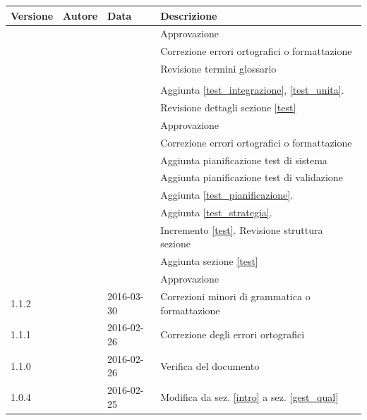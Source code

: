 \documentclass[12pt,a4paper]{article}
\begin{document}
\begin{center}
	\begin{longtable}[H]{p{} p{} p{} p{}}
		\toprule
		\textbf{Versione}	&	\textbf{Autore}	&	\textbf{Data}	&	\textbf{Descrizione}\\*
		\midrule
		\midrule
		\TODO{} &\TODO{} & \TODO{} &  Approvazione\\*
		\midrule
		\TODO{} &\TODO{} & \TODO{} & Correzione errori ortografici o formattazione \\*
		\midrule
		\TODO{} &\TODO{} & \TODO{} & Revisione termini glossario \\*
		\midrule
		\TODO{} &\TODO{} & \TODO{} &  \\*
		\midrule
		\TODO{} &\TODO{} & \TODO{} &  Aggiunta \ref{test_integrazione}, \ref{test_unita}.\\*
		\midrule
		\TODO{} &\TODO{} & \TODO{} &  Revisione dettagli sezione \ref{test}\\*
		\midrule
		\TODO{} &\TODO{} & \TODO{} &  Approvazione\\*
		\midrule
		\TODO{} &\TODO{} & \TODO{} & Correzione errori ortografici o formattazione \\*
		\midrule
		\TODO{} &\TODO{} & \TODO{} &  Aggiunta pianificazione test di sistema\\*
		\midrule
		\TODO{} &\TODO{} & \TODO{} &  Aggiunta pianificazione test di validazione\\*
		\midrule
		\TODO{} &\TODO{} & \TODO{} &   Aggiunta \ref{test_pianificazione}.\\*
		\midrule
		\TODO{} &\TODO{} & \TODO{} &   Aggiunta \ref{test_strategia}.\\*
		\midrule
		\TODO{} &\TODO{} & \TODO{} &   Incremento \ref{test}. Revisione struttura sezione\\*
		\midrule
		\TODO{} &\TODO{} & \TODO{} &   Aggiunta sezione \ref{test} \\*
		\midrule
		\TODO{} &\TODO{} & \TODO{} &  Approvazione\\*
		\midrule
		1.1.2 & \TP{} & 2016-03-30 & Correzioni minori di grammatica o formattazione \\*
		\midrule
		1.1.1 & \AVE{} & 2016-02-26 & Correzione degli errori ortografici   \\*
		\midrule
		1.1.0 & \AVE{} & 2016-02-26 & Verifica del documento \\*
		\midrule
		1.0.4 & \AB{} & 2016-02-25 & Modifica da sez. \ref{intro} a sez. \ref{gest_qual} \\*

\end{longtable}
\end{center}
\end{document}
